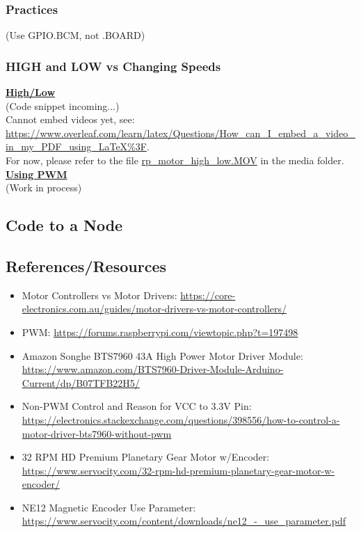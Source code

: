 \documentclass[a4paper, 10pt]{article}
\begin{document}
        \subsubsection{Practices}
        (Use GPIO.BCM, not .BOARD)
        
        \subsubsection{HIGH and LOW vs Changing Speeds}
        \underline{\textbf{High/Low}}\\
            (Code snippet incoming...)\\
            
            Cannot embed videos yet, see: \url{https://www.overleaf.com/learn/latex/Questions/How_can_I_embed_a_video_in_my_PDF_using_LaTeX%3F}.\\

            For now, please refer to the file \url{rp_motor_high_low.MOV} in the media folder.\\

        \underline{\textbf{Using PWM}}\\
            (Work in process) \\
            
    \subsection{Code to a Node}
         
    \subsection{References/Resources}
    \begin{itemize}
        \item Motor Controllers vs Motor Drivers: \url{https://core-electronics.com.au/guides/motor-drivers-vs-motor-controllers/}
        \item PWM: \url{https://forums.raspberrypi.com/viewtopic.php?t=197498}
        \item Amazon Songhe BTS7960 43A High Power Motor Driver Module: \\
        \url{https://www.amazon.com/BTS7960-Driver-Module-Arduino-Current/dp/B07TFB22H5/}
        \item Non-PWM Control and Reason for VCC to 3.3V Pin: \\ \url{https://electronics.stackexchange.com/questions/398556/how-to-control-a-motor-driver-bts7960-without-pwm}
        \item 32 RPM HD Premium Planetary Gear Motor w/Encoder: \url{https://www.servocity.com/32-rpm-hd-premium-planetary-gear-motor-w-encoder/}
        \item NE12 Magnetic Encoder Use Parameter: \\ \url{https://www.servocity.com/content/downloads/ne12_-_use_parameter.pdf}

    \end{itemize}
\end{document}
